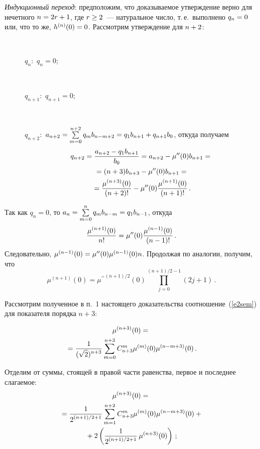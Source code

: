 \begin{multicols}{2}
{\begin{enumerate}[1.]
  \textit{Индукционный переход}: предположим, что доказываемое утверждение 
верно для нечетного $n\hm=2r\hm+1$, где $r\hm\geq 2$~--- натуральное чис\-ло, 
т.\,е.\ выполнено $q_n\hm=0$ или, что то же, $h^{(n)}(0)\hm=0$. Рассмотрим 
утверждение для $n\hm+2$:
\begin{description}
    \item[\,]
  $q_n$:\ $q_n=0$;
    \item[\,]
  $q_{n+1}$:\ $q_{n+1}=0$;
    \item[\,]
  $q_{n+2}$:\ $a_{n+2}=\sum\limits_{m=0}^{n+2} q_m b_{n-
m+2}\hm=q_1b_{n+1}\hm+q_{n+1}b_0$, откуда получаем 
\begin{multline*}
  q_{n+2} = \displaystyle\frac{\displaystyle a_{n+2}-q_1 b_{n+1}\mathstrut}{\displaystyle b_0\mathstrut}= a_{n+2} - 
\mu^{\prime\prime}(0)b_{n+1}={}\\
{}=
(n+3)b_{n+3}-\mu^{\prime\prime}(0)b_{n+1}={}\\
{}=
  \displaystyle\frac{\displaystyle \mu^{(n+3)}(0)\mathstrut}{\displaystyle (n+2)!\mathstrut}-
\mu^{\prime\prime}(0)\displaystyle\frac{\displaystyle \mu^{(n+1)}(0)\mathstrut}{\displaystyle (n+1)!\mathstrut}\,.
  \end{multline*}
  \end{description}
    Так как $q_n=0$, то $a_n\hm= \sum\limits_{m=0}^n q_m b_{n-m}\hm= 
q_1b_{n-1}$, откуда 
  $$
  \displaystyle\frac{\displaystyle \mu^{(n+1)}(0)\mathstrut}{\displaystyle n!\mathstrut}=\mu^{\prime\prime}(0)\displaystyle\frac{\displaystyle \mu^{(n-1)}(0)\mathstrut}{\displaystyle (n-1)!\mathstrut}\,.
  $$ 
  Следовательно, $\mu^{(n-1)}(0)\hm=\mu^{\prime\prime}(0)\mu^{(n-1)}(0)n$. 
Продолжая по аналогии, получим, что 
  \begin{equation}
  \mu^{(n+1)}(0) ={\mu^{\prime\prime}}^{(n+1)/2}(0) 
\prod\limits_{j=0}^{(n+1)/2-1} (2j+1)\,.
  \label{e3sem}
  \end{equation}
  
  Рассмотрим полученное в п.~1 настоящего доказательства 
соотношение~(\ref{e2sem}) для показателя порядка $n+3$:

\noindent
 \begin{multline*}
  \mu^{(n+3)}(0)={}\\
  {}=\displaystyle\frac{\displaystyle 1\mathstrut}{\displaystyle (\sqrt{2})^{n+3}\mathstrut}\sum\limits_{m=0}^{n+3} C^m_{n+3} 
\mu^{(m)}(0) \mu^{(n-m+3)}(0)\,.
  \end{multline*}
  
  Отделим от суммы, стоящей в правой части равенства, первое и последнее 
слагаемое:
  \begin{multline*}
  \mu^{(n+3)}(0) ={}\\
  {}=
  \displaystyle\frac{\displaystyle 1\mathstrut}{\displaystyle 2^{(n+1)/2+1}\mathstrut} \sum\limits_{m=1}^{n+2} 
C^m_{n+3}\mu^{(m)}(0) \mu^{(n-m+3)}(0)+{}\\
{}+ 2\left( \displaystyle\frac{\displaystyle 1\mathstrut}{\displaystyle 2^{(n+1)/2+1}\mathstrut}\,\mu^{(n+3)}(0)\right)\,;
  \end{multline*}
  

\end{enumerate}}
\end{multicols}
